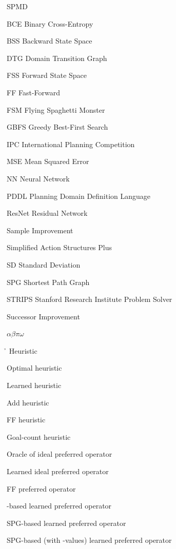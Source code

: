 \documentclass[ppgc,diss,english]{iiufrgs}
\begin{document}
\begin{listofabbrv}{SPMD}
        \item[BCE] Binary Cross-Entropy
        \item[BSS] Backward State Space
        \item[DTG] Domain Transition Graph
        \item[FSS] Forward State Space
        \item[FF] Fast-Forward
        \item[FSM] Flying Spaghetti Monster
        \item[GBFS] Greedy Best-First Search
        \item[IPC] International Planning Competition
        \item[MSE] Mean Squared Error
        \item[NN]  Neural Network
        \item[PDDL] Planning Domain Definition Language
        \item[ResNet] Residual Network
        \item[\sai] Sample Improvement
        \item[\sas] Simplified Action Structures Plus
        \item[SD] Standard Deviation
        \item[SPG] Shortest Path Graph
        \item[STRIPS] Stanford Research Institute Problem Solver
        \item[\sui] Successor Improvement
\end{listofabbrv}

\begin{listofsymbols}{$\alpha\beta\pi\omega$}
       \item[\h] Heuristic
       \item[\hstar] Optimal heuristic
       \item[\hnn] Learned heuristic
       \item[\hadd] Add heuristic
       \item[\hff] FF heuristic
       \item[\hgc] Goal-count heuristic
       \item[\postartable] Oracle of ideal preferred operator
       \item[\postar] Learned ideal preferred operator
       \item[\poff] FF preferred operator
       \item[\pofsm] \bfsrw-based learned preferred operator
       \item[\pog] SPG-based learned preferred operator
       \item[\pogstar] SPG-based (with \hstar-values) learned preferred operator
\end{listofsymbols}
\end{document}
